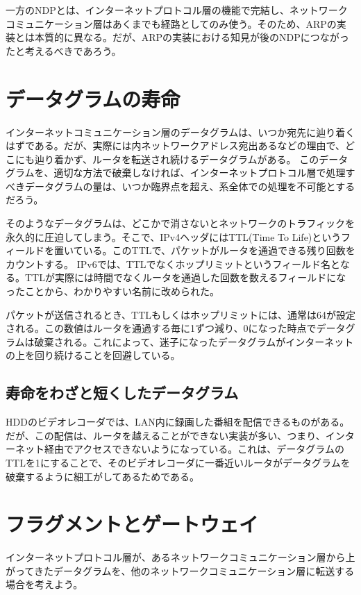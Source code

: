 一方のNDPとは、インターネットプロトコル層の機能で完結し、ネットワークコミュニケーション層はあくまでも経路としてのみ使う。そのため、ARPの実装とは本質的に異なる。だが、ARPの実装における知見が後のNDPにつながったと考えるべきであろう。



\section{データグラムの寿命}

インターネットコミュニケーション層のデータグラムは、いつか宛先に辿り着くはずである。だが、実際には内ネットワークアドレス宛出あるなどの理由で、どこにも辿り着かず、ルータを転送され続けるデータグラムがある。
このデータグラムを、適切な方法で破棄しなければ、インターネットプロトコル層で処理すべきデータグラムの量は、いつか臨界点を超え、系全体での処理を不可能とするだろう。

そのようなデータグラムは、どこかで消さないとネットワークのトラフィックを永久的に圧迫してしまう。そこで、IPv4ヘッダにはTTL(Time To Life)というフィールドを置いている。このTTLで、パケットがルータを通過できる残り回数をカウントする。
IPv6では、TTLでなくホップリミットというフィールド名となる。TTLが実際には時間でなくルータを通過した回数を数えるフィールドになったことから、わかりやすい名前に改められた。

パケットが送信されるとき、TTLもしくはホップリミットには、通常は64が設定される。この数値はルータを通過する毎に1ずつ減り、0になった時点でデータグラムは破棄される。これによって、迷子になったデータグラムがインターネットの上を回り続けることを回避している。

\subsection{寿命をわざと短くしたデータグラム}

HDDのビデオレコーダでは、LAN内に録画した番組を配信できるものがある。だが、この配信は、ルータを越えることができない実装が多い、つまり、インターネット経由でアクセスできないようになっている。これは、データグラムのTTLを1にすることで、そのビデオレコーダに一番近いルータがデータグラムを破棄するように細工がしてあるためである。

\section{フラグメントとゲートウェイ}

インターネットプロトコル層が、あるネットワークコミュニケーション層から上がってきたデータグラムを、他のネットワークコミュニケーション層に転送する場合を考えよう。

